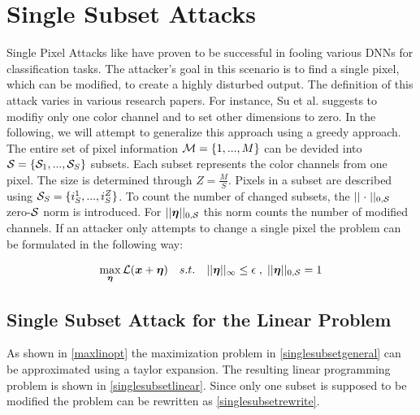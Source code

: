 
\section{Single Subset Attacks}\label{sec:section}

\begingroup
Single Pixel Attacks like \cite{SingleClassification} have proven to be successful in fooling various DNNs
for classification tasks. The attacker's goal in this scenario is to find a single pixel, which can be modified,
to create a highly disturbed output. The definition of this attack varies in various research
papers. For instance, Su et al. \cite{SingleClassification} suggests to modifiy only one color channel and to set
other dimensions to zero. In the following, we will attempt to generalize this approach using a greedy approach. The entire
set of pixel information $\mathcal{M} = \{1, ..., M\}$ can be devided into $\mathcal{S} = \{\mathcal{S}_1, ..., \mathcal{S}_S\}$
subsets. Each subset represents the color channels from one pixel. The size is determined through $Z = \frac{M}{S}$. Pixels in
a subset are described using $\mathcal{S}_S = \{i^1_S, ..., i^Z_S\}$. To count the number of changed subsets, the
$\lvert\lvert \; \cdot \; \rvert\rvert_{0, \mathcal{S}}$ zero-$\mathcal{S}$ norm is introduced. For $\lvert\lvert \bm{\eta} \rvert\rvert_{0, \mathcal{S}}$ this norm counts the number of modified channels.
If an attacker only attempts to change a single pixel the problem can be formulated in the following way:
\endgroup

\begin{equation}
\begin{aligned}
	\max_{\bm{\eta}} \mathcal{L}(\bm{x} + \bm{\eta}) \quad s.t. \quad \lvert\lvert \bm{\eta} \rvert\rvert_{\infty} \leq \epsilon \;, \; \lvert\lvert \bm{\eta} \rvert\rvert_{0, \mathcal{S}} = 1
\end{aligned}
\label{singlesubsetgeneral}
\end{equation}


\subsection{Single Subset Attack for the Linear Problem}\label{06_single_linear}

\begingroup
As shown in \ref{maxlinopt} the maximization problem in \ref{singlesubsetgeneral} can be approximated using a taylor expansion. The
resulting linear programming problem is shown in \ref{singlesubsetlinear}. Since only one subset is supposed to be modified the
problem can be rewritten as \ref{singlesubsetrewrite}.
\endgroup

